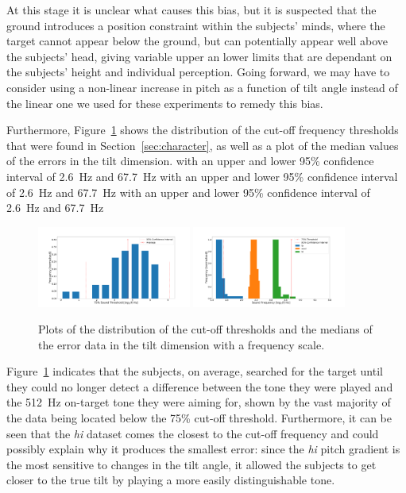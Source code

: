 \documentclass[format=sigconf, review=true, screen=true, anonymous=true]{acmart}
\begin{document}
At this stage it is unclear what causes this bias, but it is suspected that the ground introduces a position constraint within the subjects' minds, where the target cannot appear below the ground, but can potentially appear well above the subjects' head, giving variable upper an lower limits that are dependant on the subjects' height and individual perception. Going forward, we may have to consider using a non-linear increase in pitch as a function of tilt angle instead of the linear one we used for these experiments to remedy this bias. 

Furthermore, Figure~\ref{fig:tone-threshold} shows the distribution of the cut-off frequency thresholds that were found in Section~\ref{sec:character}, as well as a plot of the median values of the errors in the tilt dimension.  with an upper and lower 95\% confidence interval of \SI{2.6}{\hertz} and \SI{67.7}{\hertz} with an upper and lower 95\% confidence interval of \SI{2.6}{\hertz} and \SI{67.7}{\hertz} with an upper and lower 95\% confidence interval of \SI{2.6}{\hertz} and \SI{67.7}{\hertz}

\begin{figure}
  \centering
  \includegraphics[width=0.45\textwidth]{figures/tone_threshold.png}
  \includegraphics[width=0.45\textwidth]{figures/tone_medians.png}
  \caption{Plots of the distribution of the cut-off thresholds and the medians of the error data in the tilt dimension with a frequency scale.}
  \label{fig:tone-threshold}
\end{figure}

Figure~\ref{fig:tone-threshold} indicates that the subjects, on average, searched for the target until they could no longer detect a difference between the tone they were played and the \SI{512}{\hertz} on-target tone they were aiming for, shown by the vast majority of the data being located below the 75\% cut-off threshold. Furthermore, it can be seen that the \emph{hi} dataset comes the closest to the cut-off frequency and could possibly explain why it produces the smallest error: since the \emph{hi} pitch gradient is the most sensitive to changes in the tilt angle, it allowed the subjects to get closer to the true tilt by playing a more easily distinguishable tone.
\end{document}

